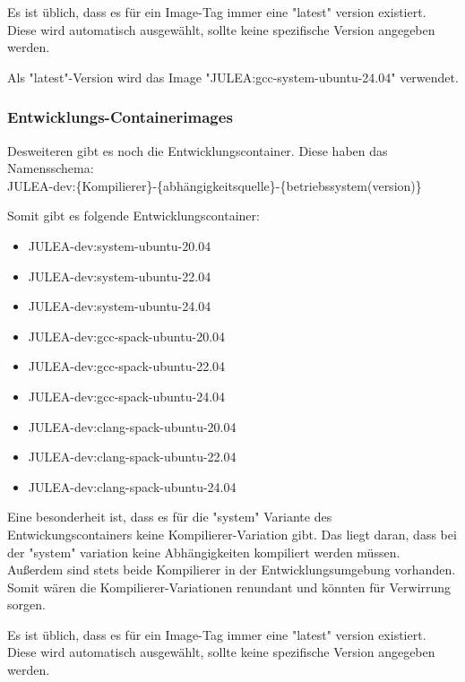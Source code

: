 Es ist üblich, dass es für ein Image-Tag immer eine "latest" version existiert. Diese wird automatisch ausgewählt, sollte keine spezifische Version angegeben werden.

Als "latest"-Version wird das Image "JULEA:gcc-system-ubuntu-24.04" verwendet. 

\subsubsection{Entwicklungs-Containerimages}

Desweiteren gibt es noch die Entwicklungscontainer. Diese haben das Namensschema: \\
JULEA-dev:\{Kompilierer\}-\{abhängigkeitsquelle\}-\{betriebssystem(version)\}

Somit gibt es folgende Entwicklungscontainer:

\begin{multicols}{2}
    \begin{itemize}
        \item JULEA-dev:system-ubuntu-20.04  
        \item JULEA-dev:system-ubuntu-22.04  
        \item JULEA-dev:system-ubuntu-24.04  
        \item JULEA-dev:gcc-spack-ubuntu-20.04   
        \item JULEA-dev:gcc-spack-ubuntu-22.04   
        \item JULEA-dev:gcc-spack-ubuntu-24.04   
        \item JULEA-dev:clang-spack-ubuntu-20.04 
        \item JULEA-dev:clang-spack-ubuntu-22.04 
        \item JULEA-dev:clang-spack-ubuntu-24.04 
    \end{itemize} 
\end{multicols}

Eine besonderheit ist, dass es für die "system" Variante des Entwickungscontainers keine Kompilierer-Variation gibt. Das liegt daran, dass bei der "system" variation keine Abhängigkeiten kompiliert werden müssen. Außerdem sind stets beide Kompilierer in der Entwicklungsumgebung vorhanden. Somit wären die Kompilierer-Variationen renundant und könnten für Verwirrung sorgen. 

Es ist üblich, dass es für ein Image-Tag immer eine "latest" version existiert. Diese wird automatisch ausgewählt, sollte keine spezifische Version angegeben werden.

